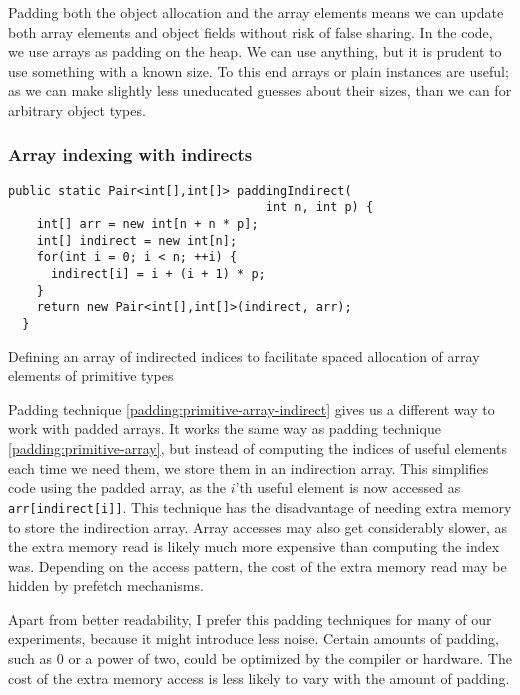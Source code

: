 Padding both the object allocation and the array elements means we can update
both array elements and object fields without risk of false sharing. In the
code, we use   arrays as padding on the heap. We can use anything, but it is
prudent to use something with a known size. To this end arrays or plain
 instances are useful; as we can make slightly less uneducated
guesses about their sizes, than we can for arbitrary object types.

\subsubsection{Array indexing with indirects}

\begin{padding}[h]
\begin{Verbatim}[frame=single]
  public static Pair<int[],int[]> paddingIndirect(
                                    int n, int p) {
    int[] arr = new int[n + n * p];
    int[] indirect = new int[n];
    for(int i = 0; i < n; ++i) {
      indirect[i] = i + (i + 1) * p;
    }
    return new Pair<int[],int[]>(indirect, arr);
  }
\end{Verbatim}
	\caption{Defining an array of indirected indices to facilitate spaced
	allocation of array elements of primitive types}
	\label{padding:primitive-array-indirect}
\end{padding}

Padding technique \ref{padding:primitive-array-indirect} gives us a different way to
work with padded arrays. It works the same way as padding technique
\ref{padding:primitive-array}, but instead of computing the indices of
useful elements each time we need them, we store them in an indirection array.
This simplifies code using the padded array, as the $i$'th
useful element is now accessed as \verb|arr[indirect[i]]|. This technique has the
disadvantage of needing extra memory to store the indirection array. Array
accesses may also get considerably slower, as the extra memory read is likely
much more expensive than computing the index was. Depending on the access
pattern, the cost of the extra memory read may be hidden by prefetch mechanisms.

Apart from better readability, I prefer this padding techniques for many of our
experiments, because it might introduce less noise. Certain amounts of padding,
such as 0 or a power of two, could be optimized by the compiler or hardware. The
cost of the extra memory access is less likely to vary with the amount of
padding.

